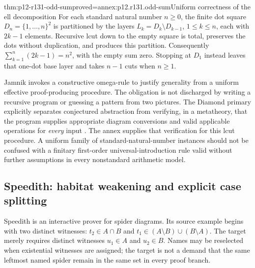 \begin{hbtheorem}{thm:p12-r131-odd-sum}{proved=annex:p12.r131.odd-sum}{Uniform correctness of the ell decomposition}
For each standard natural number \(n\geq0\), the finite dot square
\(D_n=\{1,\ldots,n\}^2\) is partitioned by the layers
\(L_k=D_k\setminus D_{k-1}\), \(1\leq k\leq n\), each with
\(2k-1\) elements. Recursive lcut down to the empty square is total,
preserves the dots without duplication, and produces this partition.
Consequently \(\sum_{k=1}^{n}(2k-1)=n^2\), with the empty sum zero.
Stopping at \(D_1\) instead leaves that one-dot base layer and takes
\(n-1\) cuts when \(n\geq1\).
\end{hbtheorem}

Jamnik invokes a constructive omega-rule to justify generality from a
uniform effective proof-producing procedure. The obligation is not
discharged by writing a recursive program or guessing a pattern from
two pictures. The Diamond primary explicitly separates conjectured
abstraction from verifying, in a metatheory, that the program supplies
appropriate diagram conversions and valid applicable operations for
\emph{every} input \cite[pp.~309--314]{JamnikBundyGreen1999Arithmetic}.
The annex supplies that verification for this lcut procedure. A uniform
family of standard-natural-number instances should not be confused with
a finitary first-order universal-introduction rule valid without further
assumptions in every nonstandard arithmetic model.

\subsection{Speedith: habitat weakening and explicit case splitting}

Speedith is an interactive prover for spider diagrams. Its source example
begins with two distinct witnesses: \(t_2\in A\cap B\) and
\(t_1\in(A\setminus B)\cup(B\setminus A)\). The target merely
requires distinct witnesses \(u_1\in A\) and \(u_2\in B\).
Names may be reselected when existential witnesses are assigned; the
target is not a demand that the same leftmost named spider remain in
the same set in every proof branch.

